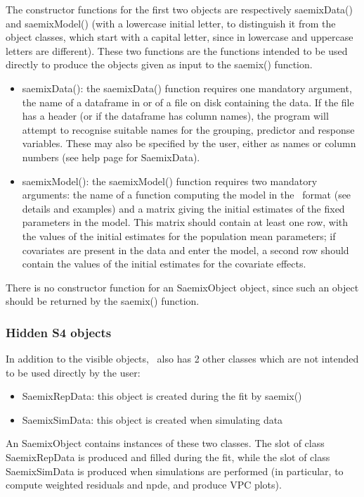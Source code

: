 The constructor functions for the first two objects are respectively {\sf saemixData()} and {\sf saemixModel()} (with a lowercase initial letter, to distinguish it from the object classes, which start with a capital letter, since in \R lowercase and uppercase letters are different). These two functions are the functions intended to be used directly to produce the objects given as input to the {\sf saemix()} function.
\begin{itemize}
\item {\sf saemixData()}: the {\sf saemixData()} function requires one mandatory argument, the name of a dataframe in \R or of a file on disk containing the data. If the file has a header (or if the dataframe has column names), the program will attempt to recognise suitable names for the grouping, predictor and response variables. These may also be specified by the user, either as names or column numbers (see help page for {\sf SaemixData}).
\item {\sf saemixModel()}: the {\sf saemixModel()} function requires two mandatory arguments: the name of a \R function computing the model in the \monolix~format (see details and examples) and a matrix giving the initial estimates of the fixed parameters in the model. This matrix should contain at least one row, with the values of the initial estimates for the population mean parameters; if covariates are present in the data and enter the model, a second row should contain  the values of the initial estimates for the covariate effects.
\end{itemize}
There is no constructor function for an {\sf SaemixObject} object, since such an object should be returned by the {\sf saemix()} function.

\subsubsection{Hidden S4 objects}

In addition to the visible objects, \monolix~also has 2 other classes which are not intended to be used directly by the user:
\begin{itemize}
\item {\sf SaemixRepData}: this object is created during the fit by {\sf saemix()}
\item {\sf SaemixSimData}: this object is created when simulating data
\end{itemize}
An {\sf SaemixObject} contains instances of these two classes. The slot of class {\sf SaemixRepData} is produced and filled during the fit, while the slot of class {\sf SaemixSimData} is produced when simulations are performed (in particular, to compute weighted residuals and npde, and produce VPC plots).

